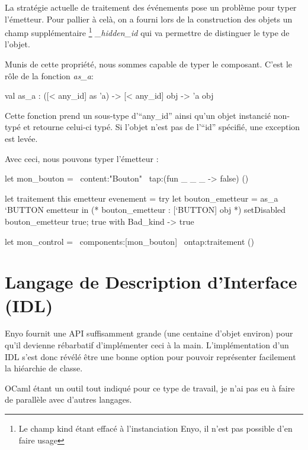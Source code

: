 \documentclass[11pt,a4paper]{report}
\begin{document}
La stratégie actuelle de traitement des événements pose un problème pour typer l'émetteur.
Pour pallier à celà, on a fourni lors de la construction des objets un champ supplémentaire
\footnote{Le champ kind étant effacé à l'instanciation Enyo, il n'est pas possible d'en faire usage} 
\emph{\_hidden\_id} qui va permettre de distinguer le type de l'objet.

Munis de cette propriété, nous sommes capable de typer le composant.
C'est le rôle de la fonction \emph{as\_a}:

\begin{OCaml}
  val as_a : ([< any_id] as 'a) -> [< any_id] obj -> 'a obj
\end{OCaml}

Cette fonction prend un sous-type d'``any\_id'' ainsi qu'un objet instancié non-typé et retourne 
celui-ci typé. Si l'objet n'est pas de l'``id'' spécifié, une exception est levée.

Avec ceci, nous pouvons typer l'émetteur :
\begin{OCaml}
  let mon_bouton = ~content:"Bouton" ~tap:(fun _ _ _ -> false) ()

  let traitement this emetteur evenement =
     try 
         let bouton_emetteur = as_a `BUTTON emetteur in
         (* bouton_emetteur : [`BUTTON] obj *)
         setDisabled bouton_emetteur true;
         true
     with Bad_kind -> true

  let mon_control = ~components:[mon_bouton] ~ontap:traitement ()
\end{OCaml}




\chapter{Langage de Description d'Interface (IDL)}\label{chap:idl}

Enyo fournit une API suffisamment grande (une centaine d'objet environ) pour qu'il devienne 
rébarbatif d'implémenter ceci à la main. L'implémentation d'un IDL s'est donc révélé être 
une bonne option pour pouvoir représenter facilement la hiéarchie de classe.

OCaml étant un outil tout indiqué pour ce type de travail, je n'ai pas eu à faire de parallèle 
avec d'autres langages.
\end{document}
